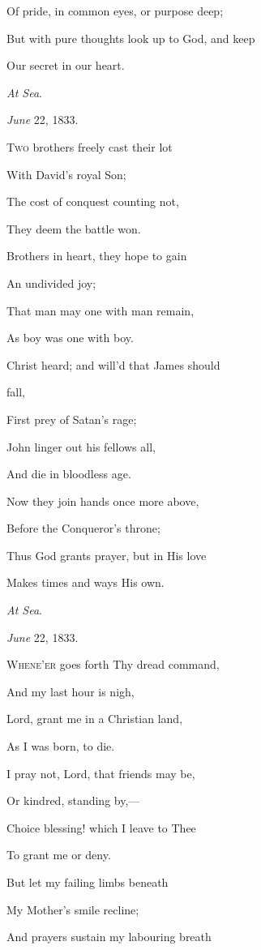 Of pride, in common eyes, or purpose deep;

But with pure thoughts look up to God, and keep

Our secret in our heart.

\emph{At Sea}.

\emph{June} 22, 1833.


T\textsc{wo} brothers freely cast their lot

With David's royal Son;

The cost of conquest counting not,

They deem the battle won.

Brothers in heart, they hope to gain

An undivided joy;

That man may one with man remain,

As boy was one with boy.

Christ heard; and will'd that James should

fall,

First prey of Satan's rage;

John linger out his fellows all,

And die in bloodless age. 

Now they join hands once more above,

Before the Conqueror's throne;

Thus God grants prayer, but in His love

Makes times and ways His own.

\emph{At Sea}.

\emph{June} 22, 1833.


W\textsc{hene'er} goes forth Thy dread command,

And my last hour is nigh,

Lord, grant me in a Christian land,

As I was born, to die.

I pray not, Lord, that friends may be,

Or kindred, standing by,—

Choice blessing! which I leave to Thee

To grant me or deny.

But let my failing limbs beneath

My Mother's smile recline;

And prayers sustain my labouring breath


